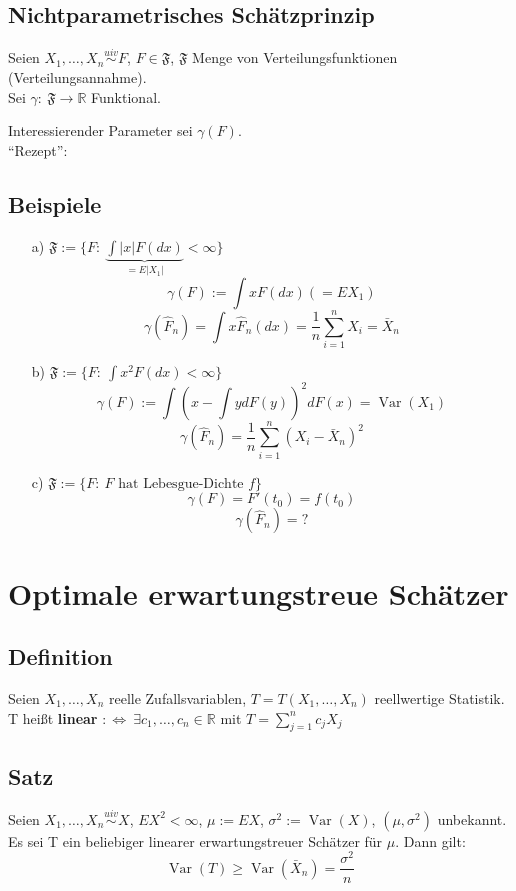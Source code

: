 \documentclass[a4paper,11pt,twoside,titlepage]{article}
\newcommand{\R}{{\mathbb R}}
\newcommand\FF{ \mathfrak{F} }
\newcommand{\uiv}{\ensuremath{\stackrel{uiv}{\sim}}}
\DeclareMathOperator{\var}{Var}
\begin{document}
\subsection{Nichtparametrisches Schätzprinzip}
Seien $X_1,\ldots,X_n\uiv F$, $F\in \FF$, $\FF$ Menge von Verteilungsfunktionen (Verteilungsannahme).\\
Sei $\gamma:\ \FF\to\R$ Funktional.

Interessierender Parameter sei $\gamma(F)$.\\
"`Rezept"': 

\subsection{Beispiele}
\begin{itemize}
\item[a)] $\FF:=\{F:\ \underbrace{\int|x|F(dx)}_{=E|X_1|}<\infty\}$
\[\gamma(F):=\int xF(dx)(=EX_1)\]
\[\gamma(\hat F_n)=\int x\hat F_n(dx)=\frac1n\sum_{i=1}^n X_i=\bar X_n\]
\item[b)] $\FF:=\{F:\ \int x^2F(dx)<\infty\}$
\[\gamma(F):=\int (x-\int ydF(y))^2dF(x)=\var(X_1)\]
\[\gamma(\hat F_n)=\frac1n\sum_{i=1}^n (X_i-\bar X_n)^2\]
\item[c)] $\FF:=\{F:\ F\mbox{ hat Lebesgue-Dichte }f\}$
\[\gamma(F)=F'(t_0)=f(t_0)\]
\[\gamma(\hat F_n)=?\]
\end{itemize}

\cleardoublepage
\section{Optimale erwartungstreue Schätzer}
\subsection{Definition}
Seien $X_1,\ldots,X_n$ reelle Zufallsvariablen, $T=T(X_1,\ldots,X_n)$ reellwertige Statistik.\\
T heißt \textbf{linear} $:\Leftrightarrow\ \exists c_1,\ldots,c_n\in\R$ mit $T=\sum\limits_{j=1}^n c_jX_j$

\subsection{Satz}
Seien $X_1,\ldots,X_n\uiv X$, $EX^2<\infty$, $\mu:=EX$, $\sigma^2:=\var(X)$, $(\mu,\sigma^2)$ unbekannt. Es sei T ein beliebiger linearer erwartungstreuer Schätzer für $\mu$. Dann gilt:
\[\var(T)\geq\var(\bar X_n)=\frac{\sigma^2}{n}\]
\end{document}
